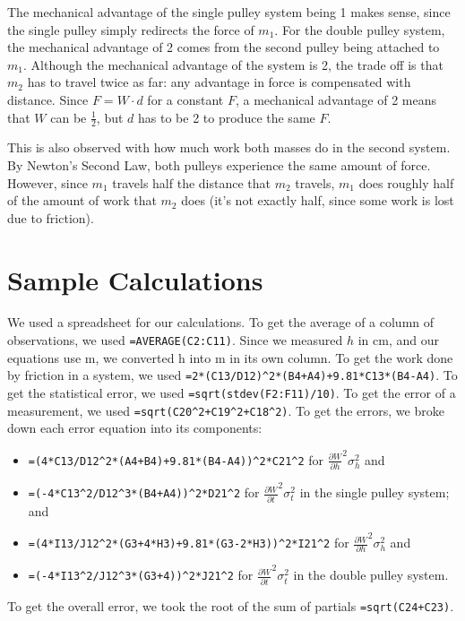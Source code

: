 \documentclass[12pt]{article}
\begin{document}
The mechanical advantage of the single pulley system being 1 makes sense, since the single pulley simply redirects the force of \(m_1\). For the double pulley system, the mechanical advantage of 2 comes from the second pulley being attached to \(m_1\). Although the mechanical advantage of the system is 2, the trade off is that \(m_2\) has to travel twice as far: any advantage in force is compensated with distance. Since \(F = W \cdot d\) for a constant \(F\), a mechanical advantage of 2 means that \(W\) can be \(\frac{1}{2}\), but \(d\) has to be 2 to produce the same \(F\).

This is also observed with how much work both masses do in the second system. By Newton's Second Law, both pulleys experience the same amount of force. However, since \(m_1\) travels half the distance that \(m_2\) travels, \(m_1\) does roughly half of the amount of work that \(m_2\) does (it's not exactly half, since some work is lost due to friction).
\section{Sample Calculations}
\label{sec:orge707679}

We used a spreadsheet for our calculations. To get the average of a column of observations, we used \texttt{=AVERAGE(C2:C11)}. Since we measured \(h\) in cm, and our equations use m, we converted h into m in its own column. To get the work done by friction in a system, we used \texttt{=2*(C13/D12)\textasciicircum{}2*(B4+A4)+9.81*C13*(B4-A4)}. To get the statistical error, we used \texttt{=sqrt(stdev(F2:F11)/10)}. To get the error of a measurement, we used \texttt{=sqrt(C20\textasciicircum{}2+C19\textasciicircum{}2+C18\textasciicircum{}2)}. To get the errors, we broke down each error equation into its components:

\begin{itemize}
\item \verb|=(4*C13/D12^2*(A4+B4)+9.81*(B4-A4))^2*C21^2| for \(\frac{\partial W}{\partial h}^2 \sigma_h^{2}\) and
\item \verb|=(-4*C13^2/D12^3*(B4+A4))^2*D21^2| for \(\frac{\partial W}{\partial t}^{2} \sigma_t^{2}\) in the single pulley system; and
\item \verb|=(4*I13/J12^2*(G3+4*H3)+9.81*(G3-2*H3))^2*I21^2| for \(\frac{\partial W}{\partial h}^{2} \sigma_h^{2}\) and
\item \verb|=(-4*I13^2/J12^3*(G3+4))^2*J21^2| for \(\frac{\partial W}{\partial t}^{2} \sigma_t^{2}\) in the double pulley system.
\end{itemize}
To get the overall error, we took the root of the sum of partials \texttt{=sqrt(C24+C23)}.
\end{document}
